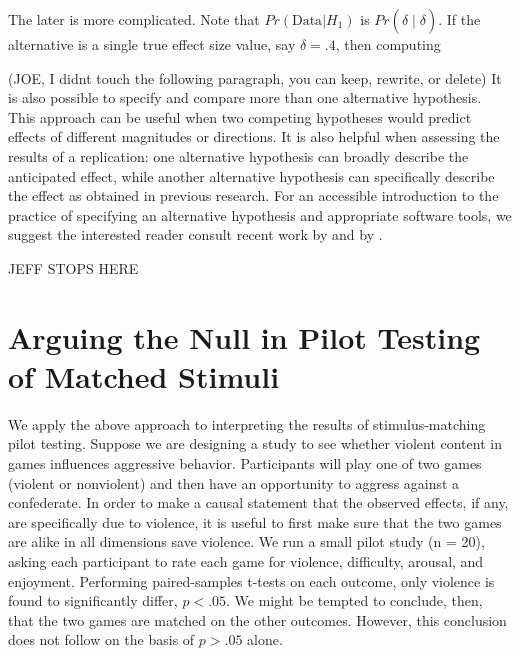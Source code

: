 \documentclass[fignum,nobf,man]{apa}
\begin{document}
The later is more complicated.  Note that $Pr(\mbox{Data} | H_1)$ is $Pr(\hat{\delta} \mid \delta)$.  If the alternative is a single true effect size value, say $\delta=.4$, then computing 

(JOE, I didnt touch the following paragraph, you can keep, rewrite, or delete)
It is also possible to specify and compare more than one alternative hypothesis. This approach can be useful when two competing hypotheses would predict effects of different magnitudes or directions. It is also helpful when assessing the results of a replication: one alternative hypothesis can broadly describe the anticipated effect, while another alternative hypothesis can specifically describe the effect as obtained in previous research. \citep[see][for an example]{Boekel:etal:in press} %
For an accessible introduction to the practice of specifying an alternative hypothesis and appropriate software tools, we suggest the interested reader consult recent work by \citet{Dienes:2011,Dienes:2014} and by \citet{Rouder:etal:2012a, Rouder:etal:2012b}. %


JEFF STOPS HERE

\section{Arguing the Null in Pilot Testing of Matched Stimuli}
We apply the above approach to interpreting the results of stimulus-matching pilot testing.  Suppose we are designing a study to see whether violent content in games influences aggressive behavior. Participants will play one of two games (violent or nonviolent) and then have an opportunity to aggress against a confederate. In order to make a causal statement that the observed effects, if any, are specifically due to violence, it is useful to first make sure that the two games are alike in all dimensions save violence. We run a small pilot study (n = 20), asking each participant to rate each game for violence, difficulty, arousal, and enjoyment. Performing paired-samples t-tests on each outcome, only violence is found to significantly differ, $p < .05$. We might be tempted to conclude, then, that the two games are matched on the other outcomes. However, this conclusion does not follow on the basis of $p > .05$ alone.
\end{document}
